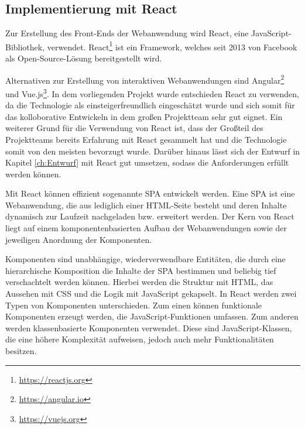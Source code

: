 \subsection{Implementierung mit React}
Zur Erstellung des Front-Ends der Webanwendung wird React, eine JavaScript-Bibliothek, verwendet.
React\footnote{\url{https://reactjs.org}} ist ein Framework, welches seit 2013 von Facebook als Open-Source-Lösung bereitgestellt wird.\autocite[Vgl.][S. 3]{React2019} 

Alternativen zur Erstellung von interaktiven Webanwendungen sind Angular\footnote{\url{https://angular.io}} und Vue.js\footnote{\url{https://vuejs.org}}. In dem vorliegenden Projekt wurde entschieden React zu verwenden, da die Technologie als einsteigerfreundlich eingeschätzt wurde und sich somit für das kolloborative Entwickeln in dem großen Projektteam sehr gut eignet. 
Ein weiterer Grund für die Verwendung von React ist, dass der Großteil des Projektteams bereits Erfahrung mit React gesammelt hat und die Technologie somit von den meisten bevorzugt wurde.
Darüber hinaus lässt sich der Entwurf in Kapitel \vref{ch:Entwurf} mit React gut umsetzen, sodass die Anforderungen erfüllt werden können. 

Mit React können effizient sogenannte \ac{SPA} entwickelt werden. 
Eine \ac{SPA} ist eine Webanwendung, die aus lediglich einer \ac{HTML}-Seite besteht und deren Inhalte dynamisch zur Laufzeit nachgeladen bzw. erweitert werden.
Der Kern von React liegt auf einem komponentenbasierten Aufbau der Webanwendungen sowie der jeweiligen Anordnung der Komponenten.\autocite[Vgl.][S. 3]{React2019} 

Komponenten sind unabhängige, wiederverwendbare Entitäten, die durch eine hierarchische Komposition die Inhalte der \ac{SPA} bestimmen und beliebig tief verschachtelt werden können.
Hierbei werden die Struktur mit \acs{HTML}, das Aussehen mit \ac{CSS} und die Logik mit JavaScript gekapselt.
In React werden zwei Typen von Komponenten unterschieden. 
Zum einen können funktionale Komponenten erzeugt werden, die JavaScript-Funktionen umfassen. 
Zum anderen werden klassenbasierte Komponenten verwendet. 
Diese sind JavaScript-Klassen, die eine höhere Komplexität aufweisen, jedoch auch mehr Funktionalitäten besitzen. 

